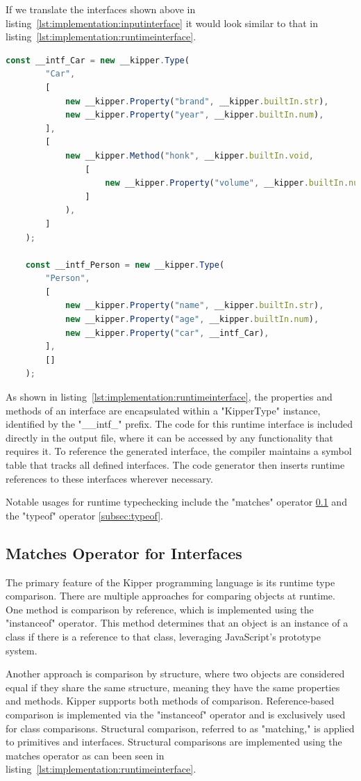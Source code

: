 If we translate the interfaces shown above in listing~\ref{lst:implementation:inputinterface} it would look similar to that in listing~\ref{lst:implementation:runtimeinterface}.

\begin{lstlisting}[language=Typescript,caption=The runtime representation of the previous interfaces,label=lst:implementation:runtimeinterface]
	const __intf_Car = new __kipper.Type(
		"Car",
		[
			new __kipper.Property("brand", __kipper.builtIn.str),
			new __kipper.Property("year", __kipper.builtIn.num),
		],
		[
			new __kipper.Method("honk", __kipper.builtIn.void,
				[
					new __kipper.Property("volume", __kipper.builtIn.num),
				]
			),
		]
	);

	const __intf_Person = new __kipper.Type(
		"Person",
		[
			new __kipper.Property("name", __kipper.builtIn.str),
			new __kipper.Property("age", __kipper.builtIn.num),
			new __kipper.Property("car", __intf_Car),
		],
		[]
	);
\end{lstlisting}

As shown in listing~\ref{lst:implementation:runtimeinterface}, the properties and methods of an interface are encapsulated within a "KipperType" instance, identified by the "\_\_intf\_" prefix. The code for this runtime interface is included directly in the output file, where it can be accessed by any functionality that requires it. To reference the generated interface, the compiler maintains a symbol table that tracks all defined interfaces. The code generator then inserts runtime references to these interfaces wherever necessary.

Notable usages for runtime typechecking include the "matches" operator \ref{subsec:matches} and the "typeof" operator \ref{subsec:typeof}.

\subsection{Matches Operator for Interfaces}
\label{subsec:matches}

The primary feature of the Kipper programming language is its runtime type comparison. There are multiple approaches for comparing objects at runtime. One method is comparison by reference, which is implemented using the "instanceof" operator. This method determines that an object is an instance of a class if there is a reference to that class, leveraging JavaScript's prototype system.

Another approach is comparison by structure, where two objects are considered equal if they share the same structure, meaning they have the same properties and methods. Kipper supports both methods of comparison. Reference-based comparison is implemented via the "instanceof" operator and is exclusively used for class comparisons. Structural comparison, referred to as "matching," is applied to primitives and interfaces. Structural comparisons are implemented using the matches operator as can been seen in listing~\ref{lst:implementation:runtimeinterface}.


